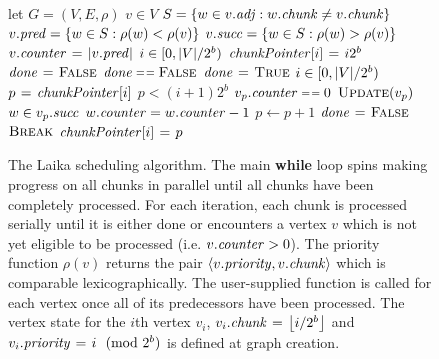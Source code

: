 \begin{figure}
\centering
  \begin{minipage}[t]{.6\linewidth}
      \begin{codebox*}
        \li let $G=(V,E,\rho)$
        \li \Parfor $v \in V$ \Do
        \li $S = \set{w \in \adj{v} : \attrib{w}{\id{chunk}} \neq \attrib{v}{\id{chunk}}}$
        \li   $\preds{v} = \set{w\in S : \rho(w) < \rho(v)}$
        \li   $\succs{v} = \set{w\in S : \rho(w) > \rho(v)}$
        \li $\counter{v} \gets \card{\preds{v}}$
            \End 
        \li \Parfor $i \in [0,\mathopen{}\left| V\right|\mathclose{}/2^b)$ \Do
        \li   $\id{chunkPointer}[i] \gets i2^b$
            \End
        \li $\id{done} \gets \const{False}$
        \li \While $\id{done} \isequal \const{False}$ \Do
        \li   $\id{done} \gets \const{True}$
        \li   \Parfor $i \in [0,\mathopen{}\left| V\right|\mathclose{}/2^b)$ \Do
        \li     $p \gets \id{chunkPointer}[i]$
        \li     \While $p < (i+1)2^b$ \Do
        \li       \If $\attrib{v_p}{\id{counter}} \isequal 0$ \Do
        \li         $\textnormal{\scshape Update}(v_p)$
        \li         \Parfor $w \in \succs{v_p}$ \Do
        \li           $\attrib{w}{\id{counter}} = \attrib{w}{\id{counter}} - 1$
                    \End
        \li         $p \gets p + 1$
        \li       \Else
        \li         $\id{done} \gets \const{False}$
        \li         $\textnormal{\scshape Break}$
                  \End
                \End
        \li   $\id{chunkPointer}[i] \gets p$
              \End
            \End  
      \end{codebox*}
    \end{minipage}
    \caption{The Laika scheduling algorithm.  The main \textbf{while}
    loop spins making progress on all chunks in parallel 
    until all chunks have been completely processed.  For
    each iteration, each chunk is processed serially until it is
    either done or encounters a vertex $v$ which is not yet eligible to
    be processed (i.e. $\attrib{v}{\id{counter}} > 0$).  The priority
    function $\rho(v)$ returns the pair 
    $\langle \attrib{v}{\id{priority}},\attrib{v}{\id{chunk}} \rangle$
    which is comparable lexicographically.  The user-supplied
    function  is called for each vertex once all of its
    predecessors have been processed.  The vertex state for the $i$th
    vertex $v_i$, 
    $\attrib{v_i}{\id{chunk}} \gets \floor{i/2^b}$ and 
    $\attrib{v_i}{\id{priority}} \gets i \pmod {2^b}$ is defined
    at graph creation.}
\label{fig:laika_code}
\end{figure}






